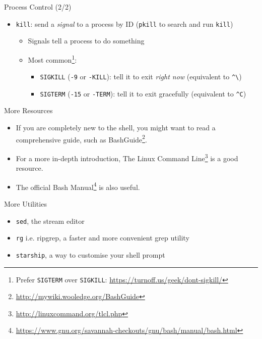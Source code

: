 \documentclass[12pt]{beamer}
\begin{document}
\begin{frame}[fragile]{Process Control (2/2)}
  \begin{itemize}
    \item \texttt{kill}: send a \emph{signal} to a process by ID (\texttt{pkill} to search and run \texttt{kill})
          \begin{itemize}
            \item Signals tell a process to do something
            \item Most common\footnote{Prefer \texttt{SIGTERM} over \texttt{SIGKILL}: \url{https://turnoff.us/geek/dont-sigkill/}}:
                  \begin{itemize}
                    \item \texttt{SIGKILL} (\texttt{-9} or \texttt{-KILL}): tell it to exit \emph{right now} (equivalent to \texttt{\^{}\textbackslash})
                    \item \texttt{SIGTERM} (\texttt{-15} or \texttt{-TERM}): tell it to exit gracefully (equivalent to \texttt{\^{}C})
                  \end{itemize}
          \end{itemize}
  \end{itemize}
\end{frame}

\begin{frame}{More Resources}
  \begin{itemize}
    \item If you are completely new to the shell, you might want to read a comprehensive guide, such as BashGuide\footnote{\url{http://mywiki.wooledge.org/BashGuide}}.
    \item For a more in-depth introduction, The Linux Command Line\footnote{\url{http://linuxcommand.org/tlcl.php}} is a good resource.
    \item The official Bash Manual\footnote{\url{https://www.gnu.org/savannah-checkouts/gnu/bash/manual/bash.html}} is also useful.
  \end{itemize}
\end{frame}

\begin{frame}{More Utilities}
  \begin{itemize}
      \item \texttt{sed}, the stream editor
      \item \texttt{rg} i.e. ripgrep, a faster and more convenient grep utility
      \item \texttt{starship}, a way to customise your shell prompt
  \end{itemize}
\end{frame}
\end{document}
